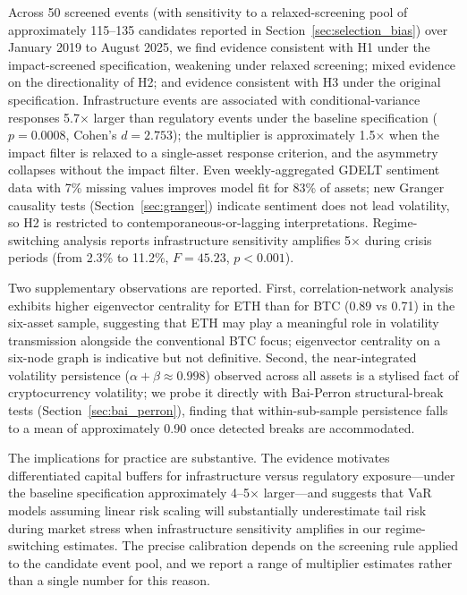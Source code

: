 \documentclass[pdflatex,sn-mathphys-num]{sn-jnl}
\theoremstyle{thmstyleone}
\theoremstyle{thmstyletwo}
\theoremstyle{thmstylethree}
\begin{document}
Across 50 screened events (with sensitivity to a relaxed-screening pool of approximately 115--135 candidates reported in Section~\ref{sec:selection_bias}) over January 2019 to August 2025, we find evidence consistent with H1 under the impact-screened specification, weakening under relaxed screening; mixed evidence on the directionality of H2; and evidence consistent with H3 under the original specification. Infrastructure events are associated with conditional-variance responses 5.7$\times$ larger than regulatory events under the baseline specification ($p=0.0008$, Cohen's $d=2.753$); the multiplier is approximately 1.5$\times$ when the impact filter is relaxed to a single-asset response criterion, and the asymmetry collapses without the impact filter. Even weekly-aggregated GDELT sentiment data with 7\% missing values improves model fit for 83\% of assets; new Granger causality tests (Section~\ref{sec:granger}) indicate sentiment does not lead volatility, so H2 is restricted to contemporaneous-or-lagging interpretations. Regime-switching analysis reports infrastructure sensitivity amplifies 5$\times$ during crisis periods (from 2.3\% to 11.2\%, $F=45.23$, $p<0.001$).

Two supplementary observations are reported. First, correlation-network analysis exhibits higher eigenvector centrality for ETH than for BTC (0.89 vs 0.71) in the six-asset sample, suggesting that ETH may play a meaningful role in volatility transmission alongside the conventional BTC focus; eigenvector centrality on a six-node graph is indicative but not definitive. Second, the near-integrated volatility persistence ($\alpha + \beta \approx 0.998$) observed across all assets is a stylised fact of cryptocurrency volatility; we probe it directly with Bai-Perron structural-break tests (Section~\ref{sec:bai_perron}), finding that within-sub-sample persistence falls to a mean of approximately 0.90 once detected breaks are accommodated.

The implications for practice are substantive. The evidence motivates differentiated capital buffers for infrastructure versus regulatory exposure---under the baseline specification approximately 4--5$\times$ larger---and suggests that VaR models assuming linear risk scaling will substantially underestimate tail risk during market stress when infrastructure sensitivity amplifies in our regime-switching estimates. The precise calibration depends on the screening rule applied to the candidate event pool, and we report a range of multiplier estimates rather than a single number for this reason.
\end{document}
